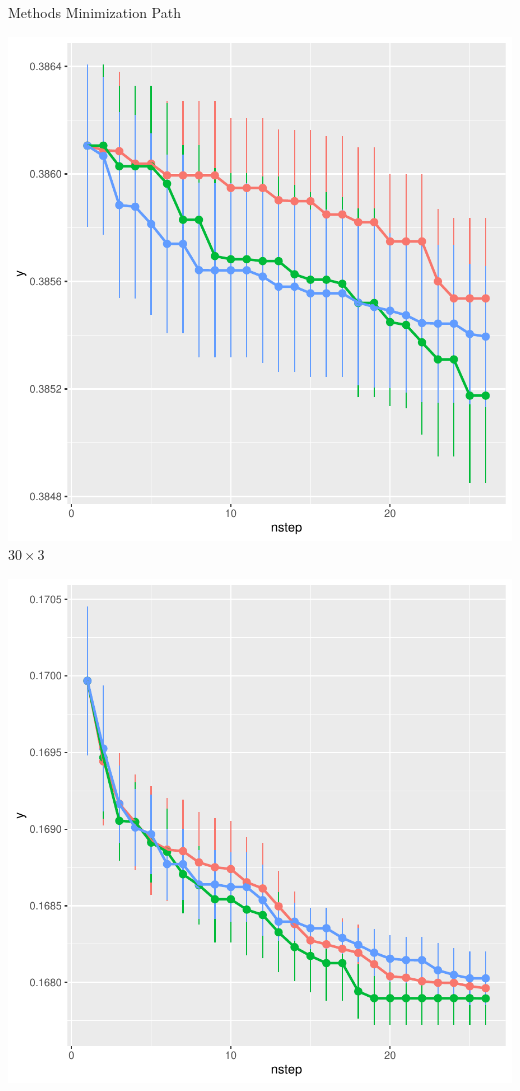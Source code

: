 \documentclass{beamer}
\begin{document}
\begin{frame}{Methods Minimization Path}
\begin{minipage}{0.32\textwidth}
\centering
\includegraphics[]{../chapters/RSO/pdfs/results30x3}
\small {$30\times 3$}
\end{minipage}
\begin{minipage}{0.32\textwidth}
\centering
\includegraphics[]{../chapters/RSO/pdfs/results50x5}

\end{minipage}
\end{frame}
\end{document}
